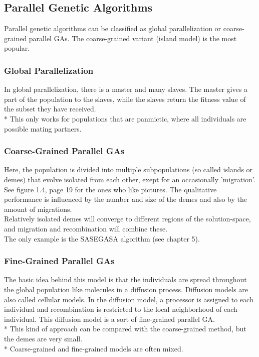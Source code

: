 \documentclass[12pt]{article}
\begin{document}
\subsection{Parallel Genetic Algorithms}
Parallel genetic algorithms can be classified as global parallelization or coarse-grained parallel GAs. The coarse-grained variant (island model) is the most popular.
\subsubsection{Global Parallelization}
In global parallelization, there is a master and many slaves. The master gives a part of the population to the slaves, while the slaves return the fitness value of the subset they have received.\\*
This only works for populations that are panmictic, where all individuals are possible mating partners.
\subsubsection{Coarse-Grained Parallel GAs}
Here, the population is divided into multiple subpopulations (so called islands or demes) that evolve isolated from each other, exept for an occasionally 'migration'. See figure 1.4, page 19 for the ones who like pictures. The qualitative performance is influenced by the number and size of the demes and also by the amount of migrations.\\
Relatively isolated demes will converge to different regions of the solution-space, and migration and recombination will combine these.\\ The only example is the SASEGASA algorithm (see chapter 5).
\subsubsection{Fine-Grained Parallel GAs}
The basic idea behind this model is that the individuals are spread throughout the global population like molecules in a diffusion process. Diffusion models are also called cellular models. In the diffusion model, a processor is assigned to each individual and recombination is restricted to the local neighborhood of each individual. This diffusion model is a sort of fine-grained parallel GA.\\*
This kind of approach can be compared with the coarse-grained method, but the demes are very small.\\*
Coarse-grained and fine-grained models are often mixed.
\end{document}
